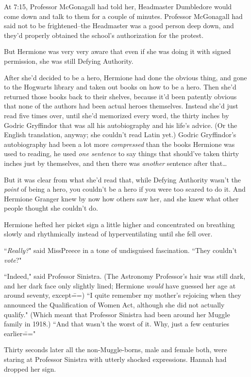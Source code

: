 At 7:15\pm, Professor McGonagall had told her, Headmaster Dumbledore would come down and talk to them for a couple of minutes. Professor McGonagall had said not to be frightened\---the Headmaster was a good person deep down, and they'd properly obtained the school's authorization for the protest.

But Hermione was very very aware that even if she was doing it with signed permission, she was still Defying Authority.

After she'd decided to be a hero, Hermione had done the obvious thing, and gone to the Hogwarts library and taken out books on how to be a hero. Then she'd returned those books back to their shelves, because it'd been patently obvious that none of the authors had been actual heroes themselves. Instead she'd just read five times over, until she'd memorized every word, the thirty inches by Godric Gryffindor that was all his autobiography and his life's advice. (Or the English translation, anyway; she couldn't read Latin yet.) Godric Gryffindor's autobiography had been a lot more \emph{compressed} than the books Hermione was used to reading, he used \emph{one sentence} to say things that should've taken thirty inches just by themselves, and then there was \emph{another} sentence after that{\ldots}

But it was clear from what she'd read that, while Defying Authority wasn't the \emph{point} of being a hero, you couldn't be a hero if you were too scared to do it. And Hermione Granger knew by now how others saw her, and she knew what other people thought she couldn't do.

Hermione hefted her picket sign a little higher and concentrated on breathing slowly and rhythmically instead of hyperventilating until she fell over.

``\emph{Really?}" said Miss\?Preece in a tone of undisguised fascination. ``They couldn't \emph{vote}?"

``Indeed," said Professor Sinistra. (The Astronomy Professor's hair was still dark, and her dark face only slightly lined; Hermione \emph{would} have guessed her age at around seventy, except\===) ``I quite remember my mother's rejoicing when they announced the Qualification of Women Act, although she did not actually qualify." (Which meant that Professor Sinistra had been around her Muggle family in 1918.) ``And that wasn't the worst of it. Why, just a few centuries earlier\==="

Thirty seconds later all the non-Muggle-borns, male and female both, were staring at Professor Sinistra with utterly shocked expressions. Hannah had dropped her sign.

